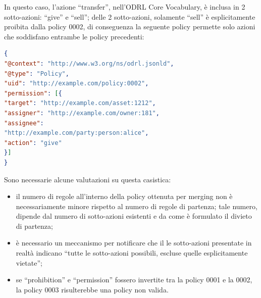 \documentclass[12pt,a4paper,twoside]{book}
\begin{document}
In questo caso, l'azione ``transfer'', nell'ODRL Core Vocabulary, è inclusa in 2 sotto-azioni: ``give'' e ``sell''; delle 2 sotto-azioni, solamente ``sell'' è esplicitamente proibita dalla policy 0002, di conseguenza la seguente policy permette solo azioni che soddisfano entrambe le policy precedenti:\newpage
\begin{lstlisting}[language=json,firstnumber=1,caption={La policy 0003 consente al soggetto Alice di cedere l'asset 1212 senza richiedere un compenso e cancellando l'asset dal proprio insieme di dati},captionpos=b]
{
"@context": "http://www.w3.org/ns/odrl.jsonld",
"@type": "Policy",
"uid": "http://example.com/policy:0002",
"permission": [{
"target": "http://example.com/asset:1212",
"assigner": "http://example.com/owner:181",
"assignee": 
"http://example.com/party:person:alice",
"action": "give"
}]
}
\end{lstlisting}
Sono necessarie alcune valutazioni su questa casistica:
\begin{itemize}
	\item il numero di regole all'interno della policy ottenuta per merging non è necessariamente minore rispetto al numero di regole di partenza; tale numero, dipende dal numero di sotto-azioni esistenti e da come è formulato il divieto di partenza;
	\item è necessario un meccanismo per notificare che il le sotto-azioni presentate in realtà indicano ``tutte le sotto-azioni possibili, escluse quelle esplicitamente vietate'';
	\item se ``prohibition'' e ``permission'' fossero invertite tra la policy 0001 e la 0002, la policy 0003 risulterebbe una policy non valida.
\end{itemize}
\end{document}
